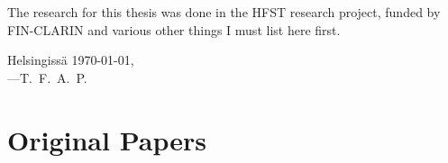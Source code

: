 \documentclass[officiallayout]{unihelcompling}
\begin{document}
The research for this thesis was done in the HFST research project, funded by
FIN-CLARIN and various other things I must list here first.

\textfinnish{Helsingissä \today,\\
---T.~F.~A.~P.}

\chapter*{Original Papers}
\end{document}
